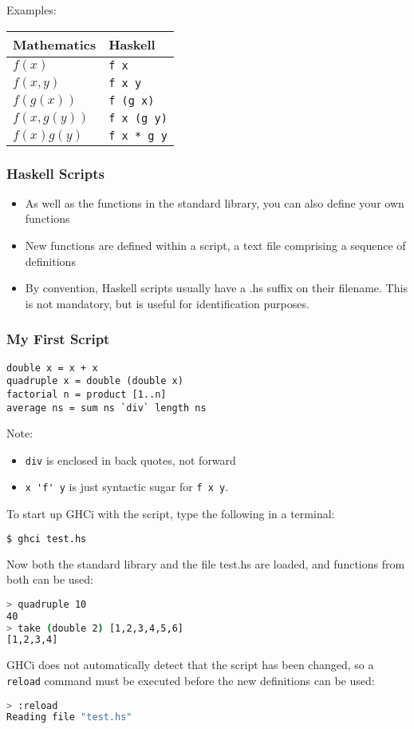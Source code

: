 \begin{multicols}{2}
Examples:\\
\begin{tabularx}{\linewidth}{|X|X|}
\hline
\textbf{Mathematics} & \textbf{Haskell} \\
\hline
$f(x)$ & \lstinline|f x| \\
$f(x,y)$ & \lstinline|f x y| \\
$f(g(x))$ & \lstinline|f (g x)| \\
$f(x,g(y))$ & \lstinline|f x (g y)| \\
$f(x)g(y)$ & \lstinline|f x * g y| \\
\hline
\end{tabularx}

\subsubsection{Haskell Scripts}
\begin{itemize}
  \item As well as the functions in the standard library, you can also define your own functions
  \item New functions are defined within a script, a text file comprising a sequence of definitions
  \item By convention, Haskell scripts usually have a .hs suffix on their filename. This is not mandatory, but is useful for identification purposes.
\end{itemize}

\subsubsection{My First Script}
\begin{lstlisting}
double x = x + x
quadruple x = double (double x)
factorial n = product [1..n]
average ns = sum ns `div` length ns
\end{lstlisting}
Note:
\begin{itemize}
  \item \lstinline{div} is enclosed in back quotes, not forward
  \item \lstinline{x 'f' y} is just syntactic sugar for \lstinline{f x y}.
\end{itemize}

To start up GHCi with the script, type the following in a terminal:
\begin{lstlisting}[language=bash]
$ ghci test.hs
\end{lstlisting}
Now both the standard library and the file test.hs are loaded, and functions from both can be used:
\begin{lstlisting}[language=bash]
> quadruple 10
40
> take (double 2) [1,2,3,4,5,6]
[1,2,3,4]
\end{lstlisting}
GHCi does not automatically detect that the script has been changed, so a \lstinline[language=bash]{reload} command must be executed before the new definitions can be used:
\begin{lstlisting}[language=bash]
> :reload
Reading file "test.hs"
\end{lstlisting}


\end{multicols}
